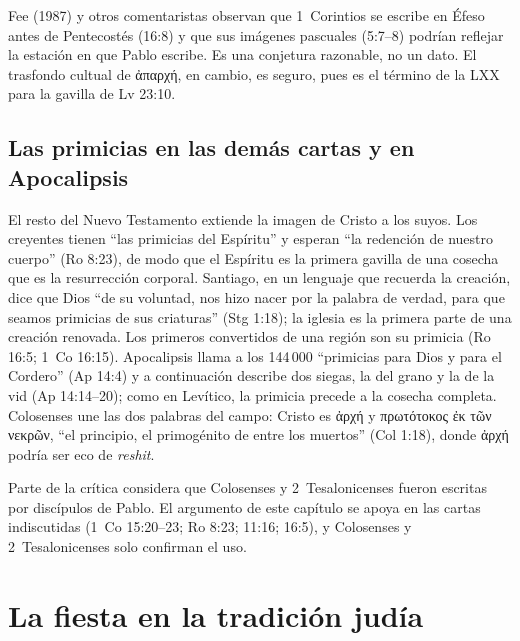 \documentclass[11pt,letterpaper]{article}
\newcommand{\grc}[1]{\foreignlanguage{ancientgreek}{#1}}
\begin{document}
\begin{nota}
Fee (1987) y otros comentaristas observan que 1~Corintios se escribe en Éfeso antes de Pentecostés (16:8) y que sus imágenes pascuales (5:7--8) podrían reflejar la estación en que Pablo escribe. Es una conjetura razonable, no un dato. El trasfondo cultual de \grc{ἀπαρχή}, en cambio, es seguro, pues es el término de la LXX para la gavilla de Lv 23:10.
\end{nota}

\subsection{Las primicias en las demás cartas y en Apocalipsis}
El resto del Nuevo Testamento extiende la imagen de Cristo a los suyos. Los creyentes tienen ``las primicias del Espíritu'' y esperan ``la redención de nuestro cuerpo'' (Ro 8:23), de modo que el Espíritu es la primera gavilla de una cosecha que es la resurrección corporal. Santiago, en un lenguaje que recuerda la creación, dice que Dios ``de su voluntad, nos hizo nacer por la palabra de verdad, para que seamos primicias de sus criaturas'' (Stg 1:18); la iglesia es la primera parte de una creación renovada. Los primeros convertidos de una región son su primicia (Ro 16:5; 1~Co 16:15). Apocalipsis llama a los 144\,000 ``primicias para Dios y para el Cordero'' (Ap 14:4) y a continuación describe dos siegas, la del grano y la de la vid (Ap 14:14--20); como en Levítico, la primicia precede a la cosecha completa. Colosenses une las dos palabras del campo: Cristo es \grc{ἀρχή} y \grc{πρωτότοκος ἐκ τῶν νεκρῶν}, ``el principio, el primogénito de entre los muertos'' (Col 1:18), donde \grc{ἀρχή} podría ser eco de \emph{reshit}.

\begin{nota}
Parte de la crítica considera que Colosenses y 2~Tesalonicenses fueron escritas por discípulos de Pablo. El argumento de este capítulo se apoya en las cartas indiscutidas (1~Co 15:20--23; Ro 8:23; 11:16; 16:5), y Colosenses y 2~Tesalonicenses solo confirman el uso.
\end{nota}

\section{La fiesta en la tradición judía}
\end{document}
